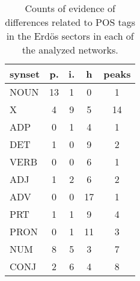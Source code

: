\begin{table}[h!]
\begin{center}
\begin{tabular}{| l || c | c | c || c |}\hline
{\bf synset} & {\bf p.} & {\bf i.} & {\bf h} & {\bf peaks} \\\hline\hline
NOUN & 13  & 1  & 0  & 1 \\
X & 4  & 9  & 5  & 14 \\\hline
ADP & 0  & 1  & 4  & 1 \\
DET & 1  & 0  & 9  & 2 \\\hline
VERB & 0  & 0  & 6  & 1 \\\hline
ADJ & 1  & 2  & 6  & 2 \\
ADV & 0  & 0  & 17  & 1 \\\hline
PRT & 1  & 1  & 9  & 4 \\
PRON & 0  & 1  & 11  & 3 \\
NUM & 8  & 5  & 3  & 7 \\
CONJ & 2  & 6  & 4  & 8 \\\hline
\end{tabular}
\caption{Counts of evidence of differences related to POS tags in the Erd\"os sectors in each of the analyzed networks.}
\end{center}
\end{table}